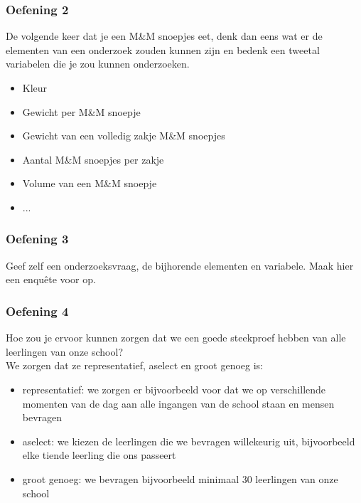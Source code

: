 \documentclass[13pt]{beamer}
\newenvironment{answer}
{\color{blue}}
{\color{black}}
\begin{document}
\begin{frame}
  \frametitle{Oefening 2}
  De volgende keer dat je een M\&M snoepjes eet, denk dan eens wat er de elementen van een onderzoek zouden kunnen zijn en bedenk een tweetal variabelen die je zou kunnen onderzoeken.\\[1em]
  \begin{itemize}
    \begin{answer}
    \item Kleur
    \item Gewicht per M\&M snoepje
    \item Gewicht van een volledig zakje M\&M snoepjes
    \item Aantal M\&M snoepjes per zakje
    \item Volume van een M\&M snoepje
    \item ...
    \end{answer}
  \end{itemize}
\end{frame}

\begin{frame}
  \frametitle{Oefening 3}
  Geef zelf een onderzoeksvraag, de bijhorende elementen en variabele. Maak hier een enquête voor op.
\end{frame}

\begin{frame}
  \frametitle{Oefening 4}
  Hoe zou je ervoor kunnen zorgen dat we een goede steekproef hebben van alle leerlingen van onze school?\\[1em]
  \begin{answer}
    We zorgen dat ze representatief, aselect en groot genoeg is:
    \begin{itemize}
      \begin{answer}
      \item representatief: we zorgen er bijvoorbeeld voor dat we op verschillende momenten van de dag aan alle ingangen van de school staan en mensen bevragen
      \item aselect: we kiezen de leerlingen die we bevragen willekeurig uit, bijvoorbeeld elke tiende leerling die ons passeert
      \item groot genoeg: we bevragen bijvoorbeeld minimaal 30 leerlingen van onze school
      \end{answer}
    \end{itemize}
  \end{answer}
\end{frame}
\end{document}
